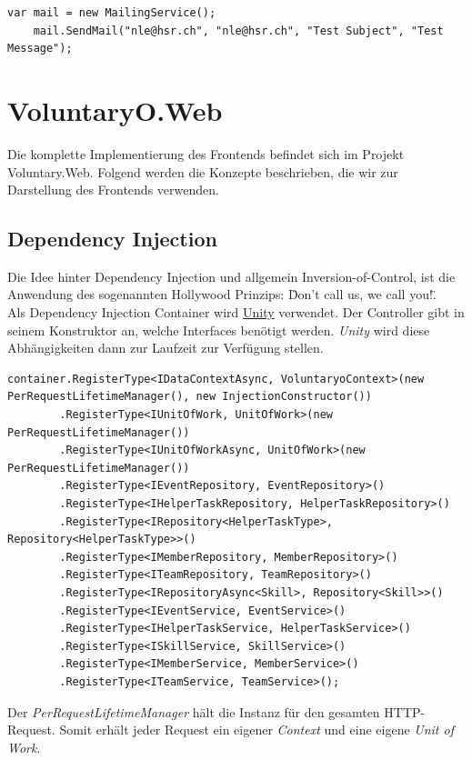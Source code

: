 		\begin{lstlisting}[language=CSharp, caption=Verwendung des MailingService, label=lst:mailingservice, firstnumber=1]
	var mail = new MailingService();
	mail.SendMail("nle@hsr.ch", "nle@hsr.ch", "Test Subject", "Test Message");
	    \end{lstlisting}
    



\section{VoluntaryO.Web}
	Die komplette Implementierung des Frontends befindet sich im Projekt Voluntary.Web. Folgend werden die Konzepte beschrieben, die wir zur Darstellung des Frontends verwenden.

	\subsection{Dependency Injection}
		Die Idee hinter Dependency Injection und allgemein Inversion-of-Control, ist die Anwendung des sogenannten Hollywood Prinzips: \"Don’t call us, we call you!\". 
		\\Als Dependency Injection Container wird \href{http://unity.codeplex.com/}{Unity} verwendet. Der Controller gibt in seinem Konstruktor an, welche Interfaces benötigt werden. \textit{Unity} wird diese Abhängigkeiten dann zur Laufzeit zur Verfügung stellen.
		\begin{lstlisting}[language=CSharp, caption=UnityConfig.cs, label=lst:unityconfig, firstnumber=1]
	container.RegisterType<IDataContextAsync, VoluntaryoContext>(new PerRequestLifetimeManager(), new InjectionConstructor())
	    .RegisterType<IUnitOfWork, UnitOfWork>(new PerRequestLifetimeManager())
	    .RegisterType<IUnitOfWorkAsync, UnitOfWork>(new PerRequestLifetimeManager())
	    .RegisterType<IEventRepository, EventRepository>()
	    .RegisterType<IHelperTaskRepository, HelperTaskRepository>()
	    .RegisterType<IRepository<HelperTaskType>, Repository<HelperTaskType>>()
	    .RegisterType<IMemberRepository, MemberRepository>()
	    .RegisterType<ITeamRepository, TeamRepository>()
	    .RegisterType<IRepositoryAsync<Skill>, Repository<Skill>>()
	    .RegisterType<IEventService, EventService>()
	    .RegisterType<IHelperTaskService, HelperTaskService>()
	    .RegisterType<ISkillService, SkillService>()
	    .RegisterType<IMemberService, MemberService>()
	    .RegisterType<ITeamService, TeamService>();
	    \end{lstlisting}
	    Der \textit{PerRequestLifetimeManager} hält die Instanz für den gesamten HTTP-Request. Somit erhält jeder Request ein eigener \textit{Context} und eine eigene \textit{Unit of Work}.

